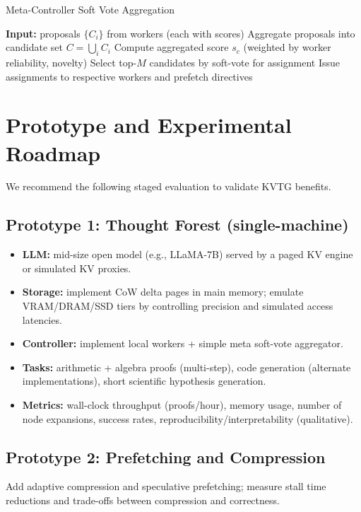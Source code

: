 \documentclass[11pt,onecolumn,letterpaper]{article}
\begin{document}
\begin{algorithm}[H]
\caption{Meta-Controller Soft Vote Aggregation}
\label{alg:meta}
\begin{algorithmic}[1]
\State \textbf{Input:} proposals \(\{C_i\}\) from workers (each with scores)
\State Aggregate proposals into candidate set \(C=\bigcup_i C_i\)
  \State Compute aggregated score \(s_c\) (weighted by worker reliability, novelty)
\EndFor
\State Select top-\(M\) candidates by soft-vote for assignment
\State Issue assignments to respective workers and prefetch directives
\end{algorithmic}
\end{algorithm}

\section{Prototype and Experimental Roadmap}
We recommend the following staged evaluation to validate KVTG benefits.

\subsection{Prototype 1: Thought Forest (single-machine)}
\begin{itemize}[nosep]
  \item \textbf{LLM:} mid-size open model (e.g., LLaMA-7B) served by a paged KV engine or simulated KV proxies.
  \item \textbf{Storage:} implement CoW delta pages in main memory; emulate VRAM/DRAM/SSD tiers by controlling precision and simulated access latencies.
  \item \textbf{Controller:} implement local workers + simple meta soft-vote aggregator.
  \item \textbf{Tasks:} arithmetic + algebra proofs (multi-step), code generation (alternate implementations), short scientific hypothesis generation.
  \item \textbf{Metrics:} wall-clock throughput (proofs/hour), memory usage, number of node expansions, success rates, reproducibility/interpretability (qualitative).
\end{itemize}

\subsection{Prototype 2: Prefetching and Compression}
Add adaptive compression and speculative prefetching; measure stall time reductions and trade-offs between compression and correctness.
\end{document}
